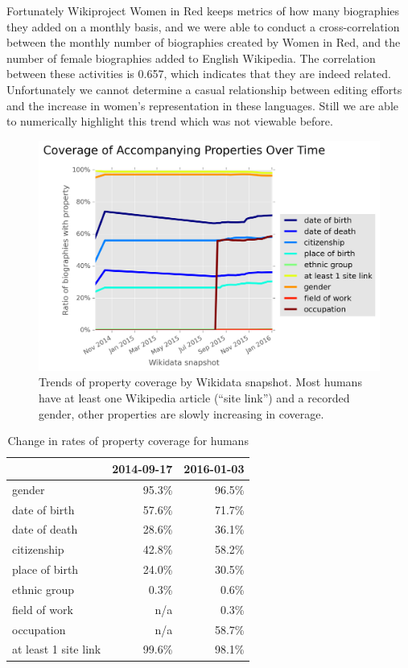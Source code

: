 \documentclass{sig-alternate-05-2015}
\begin{document}
Fortunately Wikiproject Women in Red keeps metrics of how many biographies they added on a monthly basis, and we were able to conduct a cross-correlation between the monthly number of biographies created by Women in Red, and the number of female biographies added to English Wikipedia. The correlation between these activities is 0.657, which indicates that they are indeed related. Unfortunately we cannot determine a casual relationship between editing efforts and the increase in women's representation in these languages. Still we are able to numerically highlight this trend which was not viewable before.


\begin{figure}
\includegraphics[scale=0.45]{figures/additionalprops.png} 
\caption{Trends of property coverage by Wikidata snapshot. Most humans have at least one Wikipedia article (``site link'') and a recorded gender, other properties are slowly increasing in coverage.}
\label{fig:accompanying}
\end{figure}


\begin{table}
\caption{Change in rates of property coverage for humans}
\begin{tabular}{lrr}
\toprule
{} &  2014-09-17 &  2016-01-03 \\
\midrule
gender               &       95.3\% &       96.5\% \\
date of birth        &       57.6\% &       71.7\% \\
date of death        &       28.6\% &       36.1\% \\
citizenship          &       42.8\% &       58.2\% \\
place of birth       &       24.0\% &       30.5\% \\
ethnic group         &        0.3\% &        0.6\% \\
field of work        &        n/a &        0.3\% \\
occupation           &        n/a &       58.7\% \\
at least 1 site link &       99.6\% &       98.1\% \\
\bottomrule
\end{tabular}
\label{table:accompanying}
\end{table}
\end{document}
